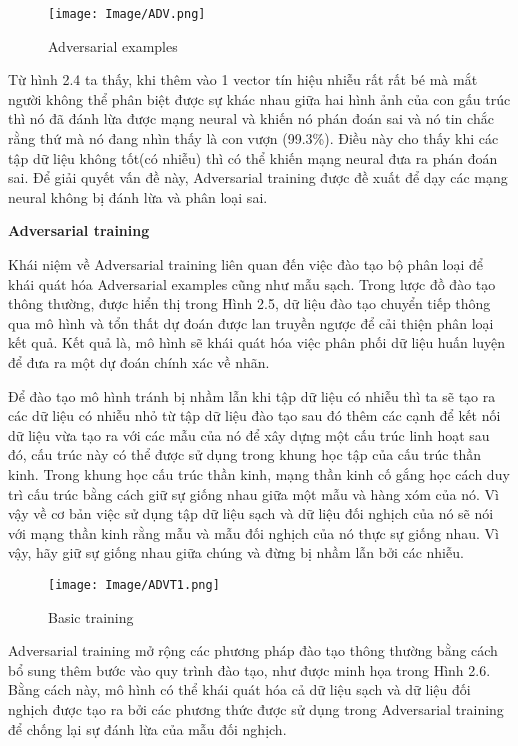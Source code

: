 \begin{figure}[h!]
    \centering
    \texttt{[image: Image/ADV.png]}
    \caption{Adversarial examples}
    \label{Hình 1.4: Adversarial examples}
    \cite*{Reference7}
\end{figure}

Từ hình 2.4 ta thấy, khi thêm vào 1 vector tín hiệu nhiễu rất rất bé mà mắt người không thể phân biệt được sự khác nhau giữa hai hình ảnh của con gấu trúc thì nó đã đánh lừa được mạng neural và khiến nó phán đoán sai và nó tin chắc rằng
thứ mà nó đang nhìn thấy là con vượn (99.3\%). Điều này cho thấy khi các tập dữ liệu không tốt(có nhiễu) thì có thể khiến mạng neural đưa ra phán đoán sai.
 Để giải quyết vấn đề này, Adversarial training được đề xuất để dạy các mạng neural không bị đánh lừa và phân loại sai. 

\cite*{Reference6}
\textbf{Adversarial training}

Khái niệm về Adversarial training liên quan đến việc đào tạo bộ phân loại để khái quát hóa
Adversarial examples cũng như mẫu sạch. Trong lược đồ đào tạo thông thường, được hiển thị trong Hình 2.5, dữ liệu đào tạo chuyển tiếp
thông qua mô hình và tổn thất dự đoán được lan truyền ngược để cải thiện phân loại
kết quả. Kết quả là, mô hình sẽ khái quát hóa việc phân phối dữ liệu huấn luyện để
đưa ra một dự đoán chính xác về nhãn. 

Để đào tạo mô hình tránh bị nhầm lẫn khi tập dữ liệu có nhiễu thì ta sẽ tạo ra các dữ liệu có nhiễu nhỏ từ tập dữ liệu đào tạo
sau đó thêm các cạnh để kết nối dữ liệu vừa tạo ra với các mẫu của nó để xây dựng một cấu trúc linh hoạt sau đó, cấu trúc này có thể được sử dụng trong khung học tập
của cấu trúc thần kinh. Trong khung học cấu trúc thần kinh, mạng thần kinh cố gắng học cách duy trì cấu trúc bằng cách giữ sự giống nhau giữa một mẫu và hàng xóm của nó.
 Vì vậy về cơ bản việc sử dụng tập dữ liệu sạch và dữ liệu đối nghịch của nó sẽ nói với mạng thần kinh rằng mẫu và mẫu đối nghịch của nó thực sự giống nhau. Vì vậy, hãy giữ sự 
 giống nhau giữa chúng và đừng bị nhầm lẫn bởi các nhiễu.

\begin{figure}[h!]
    \centering
    \texttt{[image: Image/ADVT1.png]}
    \caption{Basic training}
    \label{Hình 2.5: Adversarial training}
    \cite*{Reference8}
\end{figure}

Adversarial training mở rộng các phương pháp đào tạo thông thường bằng cách bổ sung thêm
bước vào quy trình đào tạo, như được minh họa trong Hình 2.6. Bằng cách này, mô hình có thể
khái quát hóa cả dữ liệu sạch và dữ liệu đối nghịch được tạo ra bởi các phương thức
được sử dụng trong Adversarial training để chống lại sự đánh lừa của mẫu đối nghịch.

